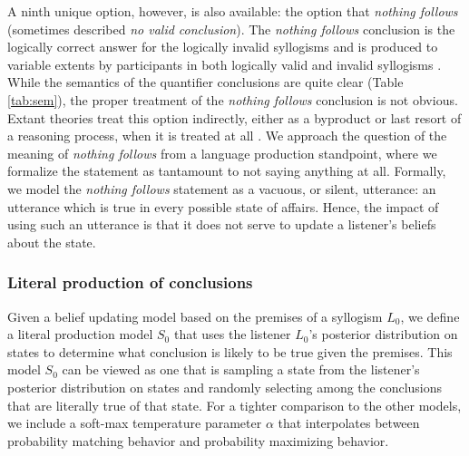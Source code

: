 \documentclass[floatsintext, doc]{apa6}
\begin{document}
A ninth unique option, however, is also available: the option that \emph{nothing follows} (sometimes described \emph{no valid conclusion}). 
The \emph{nothing follows} conclusion is the logically correct answer for the logically invalid syllogisms and is produced to variable extents by participants in both logically valid and invalid syllogisms \cite{Khemlani2012}.
While the semantics of the quantifier conclusions are quite clear (Table \ref{tab:sem}), the proper treatment of the \emph{nothing follows} conclusion is not obvious. 
Extant theories treat this option indirectly, either as a byproduct or last resort of a reasoning process, when it is treated at all \cite{ragni2019does, riesterer2020modeling}.
We approach the question of the meaning of \emph{nothing follows} from a language production standpoint, where we formalize the statement as tantamount to not saying anything at all. 
Formally, we model the \emph{nothing follows} statement as a vacuous, or silent, utterance: an utterance which is true in every possible state of affairs.
Hence, the impact of using such an utterance is that it does not serve to update a listener's beliefs about the state. 


\subsubsection{Literal production of conclusions}

Given a belief updating model based on the premises of a syllogism $L_0$, %
we define a literal production model $S_0$ that uses the listener $L_0$'s posterior distribution on states to determine what conclusion is likely to be true given the premises. 
This model $S_0$ can be viewed as one that is sampling a state from the listener's posterior distribution on states and randomly selecting among the conclusions that are literally true of that state. 
For a tighter comparison to the other models, we include a soft-max temperature parameter $\alpha$ that interpolates between probability matching behavior and probability maximizing behavior. 
\end{document}
